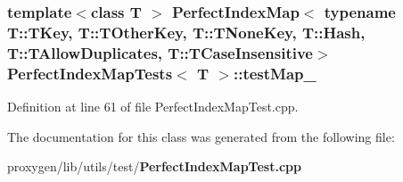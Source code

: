 \subsubsection[{test\+Map\+\_\+}]{\setlength{\rightskip}{0pt plus 5cm}template$<$class T $>$ {\bf Perfect\+Index\+Map}$<$ typename T\+::\+T\+Key, T\+::\+T\+Other\+Key, T\+::\+T\+None\+Key, T\+::\+Hash, T\+::\+T\+Allow\+Duplicates, T\+::\+T\+Case\+Insensitive$>$ {\bf Perfect\+Index\+Map\+Tests}$<$ {\bf T} $>$\+::test\+Map\+\_\+\hspace{0.3cm}{\ttfamily [protected]}}\label{classPerfectIndexMapTests_ae0e11bd8dabf16e6fbcaed3cd4fff946}


Definition at line 61 of file Perfect\+Index\+Map\+Test.\+cpp.



The documentation for this class was generated from the following file\+:\begin{DoxyCompactItemize}
\item 
proxygen/lib/utils/test/{\bf Perfect\+Index\+Map\+Test.\+cpp}\end{DoxyCompactItemize}
